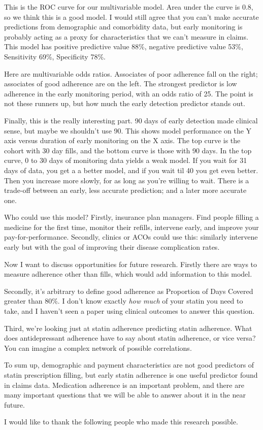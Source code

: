 \documentclass[12pt]{report}
\begin{document}
\begin{large}
This is the ROC curve for our multivariable model. Area under the
curve is 0.8, so we think this is a good model. I would still agree
that you can't make accurate predictions from demographic and
comorbidity data, but early monitoring is probably acting as a proxy
for characteristics that we can't measure in claims. This model has
positive predictive value 88\%, negative predictive value 53\%,
Sensitivity 69\%, Specificity 78\%. %

Here are multivariable odds ratios. Associates of poor adherence fall
on the right; associates of good adherence are on the left. The
strongest predictor is low adherence in the early monitoring period,
with an odds ratio of 25. The point is not these runners up, but how
much the early detection predictor stands out. %

Finally, this is the really interesting part. 90 days of early
detection made clinical sense, but maybe we shouldn't use 90. This
shows model performance on the Y axis versus duration of early
monitoring on the X axis. The top curve is the cohort with 30 day
fills, and the bottom curve is those with 90 days. In the top curve, 0
to 30 days of monitoring data yields a weak model. If you wait for 31
days of data, you get a a better model, and if you wait til 40 you get
even better. Then you increase more slowly, for as long as you're
willing to wait. There is a trade-off between an early, less accurate
prediction; and a later more accurate one. %

Who could use this model? Firstly, insurance plan managers. Find
people filling a medicine for the first time, monitor their refills,
intervene early, and improve your pay-for-performance. Secondly,
clinics or ACOs could use this: similarly intervene early but with the
goal of improving their disease complication rates. %

Now I want to discuss opportunities for future research. First\-ly
there are ways to measure adherence other than fills, which would add
information to this model.

Secondly, it's arbitrary to define good adherence as Proportion of
Days Covered greater than 80\%. I don't know exactly \emph{how much}
of your statin you need to take, and I haven't seen a paper using
clinical outcomes to answer this question.

Third, we're looking just at statin adherence predicting statin
adherence. What does antidepressant adherence have to say about statin
adherence, or vice versa? You can imagine a complex network of
possible correlations.

To sum up, demographic and payment characteristics are not good
predictors of statin prescription filling, but early statin adherence
is one useful predictor found in claims data. Medication adherence is
an important problem, and there are many important questions that we
will be able to answer about it in the near future.

I would like to thank the following people who made this research
possible. %


\end{large}
\end{document}
